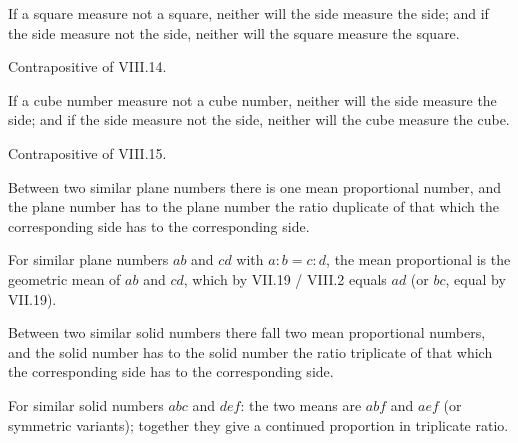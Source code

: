 \begin{claim}
\label{prop:VIII.16}
If a square measure not a square, neither will the side measure the
side; and if the side measure not the side, neither will the square
measure the square.
\end{claim}
\begin{evidence}
\label{ev:VIII.16}
Contrapositive of VIII.14.
\end{evidence}

\begin{claim}
\label{prop:VIII.17}
If a cube number measure not a cube number, neither will the side
measure the side; and if the side measure not the side, neither will
the cube measure the cube.
\end{claim}
\begin{evidence}
\label{ev:VIII.17}
Contrapositive of VIII.15.
\end{evidence}

\begin{claim}
\label{prop:VIII.18}
Between two similar plane numbers there is one mean proportional
number, and the plane number has to the plane number the ratio
duplicate of that which the corresponding side has to the
corresponding side.
\end{claim}
\begin{evidence}
\label{ev:VIII.18}
For similar plane numbers $ab$ and $cd$ with $a : b = c : d$, the
mean proportional is the geometric mean of $ab$ and $cd$, which by
VII.19 / VIII.2 equals $ad$ (or $bc$, equal by VII.19).
\end{evidence}

\begin{claim}
\label{prop:VIII.19}
Between two similar solid numbers there fall two mean proportional
numbers, and the solid number has to the solid number the ratio
triplicate of that which the corresponding side has to the
corresponding side.
\end{claim}
\begin{evidence}
\label{ev:VIII.19}
For similar solid numbers $abc$ and $def$: the two means are $abf$
and $aef$ (or symmetric variants); together they give a continued
proportion in triplicate ratio.
\end{evidence}

